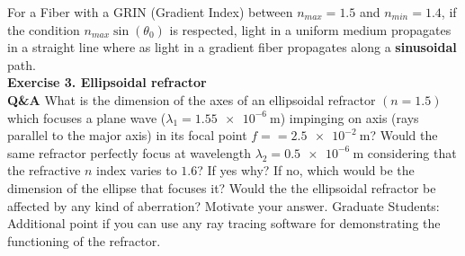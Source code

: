 \documentclass[main.tex]{subfiles}
\begin{document}
For a Fiber with a GRIN (Gradient Index) between $n_{max} = 1.5$ and $n_{min} = 1.4$, if the condition $n_{max}\sin(\theta_0)$ is respected, light in a uniform medium propagates in a straight line where as light in a gradient fiber propagates along a \textbf{sinusoidal} path.\\

\textbf{Exercise 3. Ellipsoidal refractor}\\
\textbf{Q\&A} What is the dimension of the axes of an ellipsoidal refractor $(n=1.5)$ which focuses a plane wave ($\lambda_1 = \SI{1.55e-6}{\meter}$) impinging on axis (rays parallel to the major axis) in its focal point $f = = \SI{2.5e-2}{\meter}$? Would the same refractor perfectly focus at wavelength $\lambda_2 = \SI{0.5e-6}{\meter}$ considering that the refractive $n$ index varies to $1.6$? If yes why? If no, which would be the dimension of the ellipse that focuses it? Would the the ellipsoidal refractor be affected by any kind of aberration? Motivate your answer. Graduate Students: Additional point if you can use any ray tracing software for demonstrating the functioning of the refractor.
\end{document}

